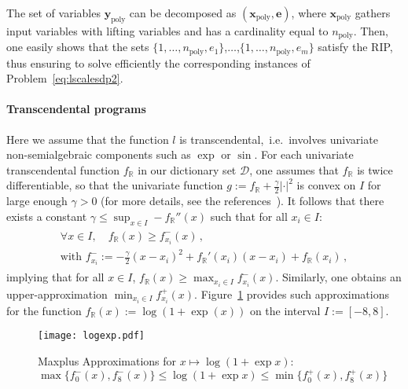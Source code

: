 \documentclass[preprint,fleqn,nocopyrightspace]{sigplanconf}
\newcommand{\setD}{\mathcal{D}} %
\newcommand{\R}{\mathbb{R}}
\newcommand{\x}{\mathbf{x}}
\newcommand{\e}{\mathbf{e}}
\newcommand{\y}{\mathbf{y}}
\newcommand{\poly}{_\text{poly}}
\theoremstyle{plain}
\begin{document}
The set of variables $\y\poly$ can be decomposed as $(\x\poly, \e)$, where $\x\poly$ gathers input variables with lifting variables and has a cardinality equal to $n\poly$.
Then, one easily shows that the sets $\{1, \dots, n\poly, e_1\}$,$\dots$,$\{1, \dots, n\poly, e_m\}$ satisfy the RIP, thus ensuring to solve efficiently the corresponding instances of Problem~\eqref{eq:lscalesdp2}.
%
\paragraph{Transcendental programs}
%
Here we assume that the function $l$ is transcendental,~i.e.~involves univariate non-semialgebraic components such as $\exp$ or $\sin$. For each univariate transcendental function $f_{\R}$ in our dictionary set $\setD$, one assumes that $f_{\R}$ is twice differentiable, so that the univariate function $g := f_{\R} + \frac{\gamma}{2} |\cdot|^2$ is convex on $I$ for large enough $\gamma > 0$ (for more details, see the references~\cite{agk04, mceneaney-livre}). It follows that there exists a constant $\gamma \leq \sup_{x\in I} -f_{\R}''(x)$ such that for all $x_i \in I$:
\begin{align}
\begin{split}
\label{eq:maxplus}
\forall x \in I, \quad f_{\R} (x)  \geq f_{x_i}^-(x) \,,\\
\text{with } f_{x_i}^- :=  -\frac{\gamma}{2} (x-x_i)^2 +f_{\R}'(x_i) (x - x_i) + f_{\R} (x_i) \,,
\end{split}
\end{align}
implying that for all $x \in I$, $f_{\R} (x)  \geq \max_{x_i \in I} f_{x_i}^-(x)$. Similarly, one obtains an upper-approximation $\min_{x_i \in I} f_{x_i}^+(x)$.
Figure~\ref{fig:logexp} provides such approximations for the function $f_{\R}(x) := \log (1 + \exp(x))$ on the interval $I := [-8, 8]$.
%
\begin{figure}[!ht]
\begin{center}
\texttt{[image: logexp.pdf]}
\caption{Maxplus Approximations for $x \mapsto \log(1 + \exp{x})$: $\max \{ f_0^- (x), f_8^- (x)\} \leq  \log(1 + \exp{x}) \leq \min \{ f_0^+ (x), f_8^+ (x)\} $}\label{fig:logexp}
\end{center}
\end{figure}
%
\end{document}
